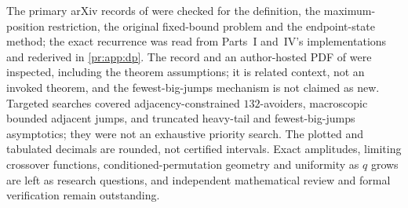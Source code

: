 \documentclass[11pt,a4paper]{article}
\theoremstyle{definition}\newaliascnt{definition}{theorem}
\theoremstyle{remark}\newaliascnt{remark}{theorem}
\begin{document}
The primary arXiv records of \cite{Nadler,MayamaAkita} were checked for the
definition, the maximum-position restriction, the original fixed-bound
problem and the endpoint-state method; the exact recurrence was read from
Parts~I and~IV's implementations and rederived in \cref{pr:app:dp}. The
record and an author-hosted PDF of \cite{pr:KerriouMorters} were inspected,
including the theorem assumptions; it is related context, not an invoked
theorem, and the fewest-big-jumps mechanism is not claimed as new. Targeted
searches covered adjacency-constrained $132$-avoiders, macroscopic bounded
adjacent jumps, and truncated heavy-tail and fewest-big-jumps asymptotics;
they were not an exhaustive priority search. The plotted and tabulated
decimals are rounded, not certified intervals. Exact amplitudes, limiting
crossover functions, conditioned-permutation geometry and uniformity as $q$
grows are left as research questions, and independent mathematical review
and formal verification remain outstanding.
\end{document}
